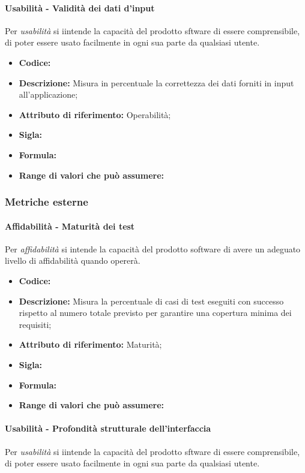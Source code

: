 \paragraph{Usabilità - Validità dei dati d'input}
Per \textit{usabilità} si iintende la capacità del prodotto sftware di essere comprensibile, di poter essere usato facilmente in ogni sua parte da qualsiasi utente.

\begin{itemize}
    \item \textbf{Codice:} 
    \item \textbf{Descrizione:} Misura in percentuale la correttezza dei dati forniti in input all'applicazione;
    \item \textbf{Attributo di riferimento:} Operabilità;
    \item \textbf{Sigla:}
    \item \textbf{Formula:}
    \item \textbf{Range di valori che può assumere:}
\end{itemize}




\subsubsection{Metriche esterne}

\paragraph{Affidabilità - Maturità dei test}
Per \textit{affidabilità} si intende la capacità del prodotto software di avere un adeguato livello di affidabilità quando opererà.

\begin{itemize}
    \item \textbf{Codice:} 
    \item \textbf{Descrizione:} Misura la percentuale di casi di test eseguiti con successo rispetto al numero totale previsto per garantire una copertura minima dei requisiti;
    \item \textbf{Attributo di riferimento:} Maturità;
    \item \textbf{Sigla:}
    \item \textbf{Formula:}
    \item \textbf{Range di valori che può assumere:}
\end{itemize}


\paragraph{Usabilità - Profondità strutturale dell'interfaccia}
Per \textit{usabilità} si iintende la capacità del prodotto sftware di essere comprensibile, di poter essere usato facilmente in ogni sua parte da qualsiasi utente.

